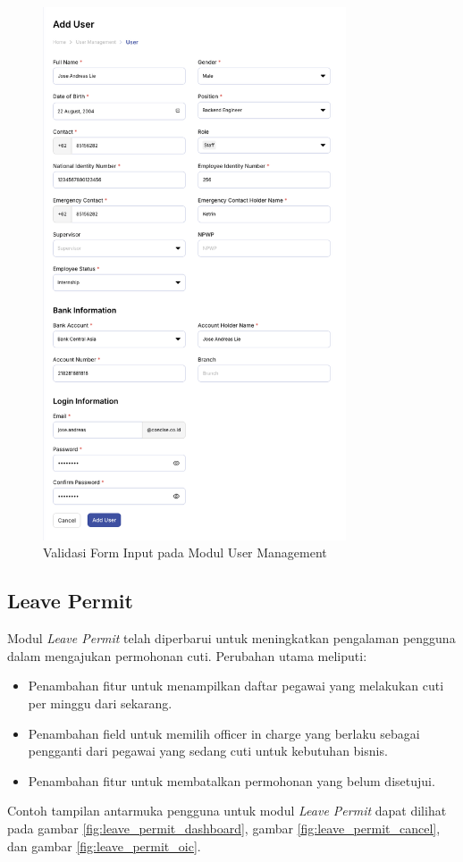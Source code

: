 \begin{figure}[H]
\centering
\includegraphics[width=0.8\textwidth]{assets/pics/fig_user_management_validation_form.png}
\caption{Validasi Form Input pada Modul User Management}
\label{fig:user_management_validation}
\end{figure}


\subsection{Leave Permit}
Modul \textit{Leave Permit} telah diperbarui untuk meningkatkan pengalaman pengguna dalam mengajukan permohonan cuti. Perubahan utama meliputi:
\begin{itemize}
    \item Penambahan fitur untuk menampilkan daftar pegawai yang melakukan cuti per minggu dari sekarang.
    \item Penambahan field untuk memilih officer in charge yang berlaku sebagai pengganti dari pegawai yang sedang cuti untuk kebutuhan bisnis.
    \item Penambahan fitur untuk membatalkan permohonan yang belum disetujui.
\end{itemize}
Contoh tampilan antarmuka pengguna untuk modul \textit{Leave Permit} dapat dilihat pada gambar \ref{fig:leave_permit_dashboard}, gambar \ref{fig:leave_permit_cancel}, dan gambar \ref{fig:leave_permit_oic}.


